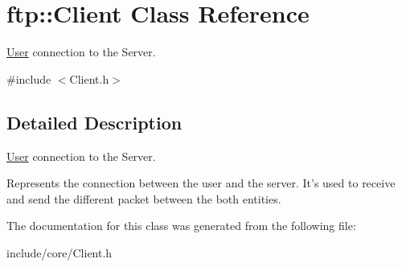 \hypertarget{classftp_1_1_client}{\section{ftp\-:\-:Client Class Reference}
\label{classftp_1_1_client}
}


\hyperlink{structftp_1_1_user}{User} connection to the Server.  




{\ttfamily \#include $<$Client.\-h$>$}



\subsection{Detailed Description}
\hyperlink{structftp_1_1_user}{User} connection to the Server. 

Represents the connection between the user and the server. It's used to receive and send the different packet between the both entities. 

The documentation for this class was generated from the following file\-:\begin{DoxyCompactItemize}
\item 
include/core/Client.\-h\end{DoxyCompactItemize}
